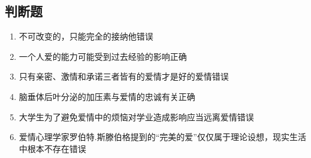 \documentclass{article}
\begin{document}
	\subsection*{判断题}
	\begin{enumerate}
		\item 不可改变的，只能完全的接纳他\hfill 错误
		
		\item 一个人爱的能力可能受到过去经验的影响\hfill 正确
		
		\item 只有亲密、激情和承诺三者皆有的爱情才是好的爱情\hfill 错误 

		\item 脑垂体后叶分泌的加压素与爱情的忠诚有关\hfill 正确

		\item 大学生为了避免爱情中的烦恼对学业造成影响应当远离爱情\hfill 错误

		\item 爱情心理学家罗伯特.斯滕伯格提到的“完美的爱”仅仅属于理论设想，现实生活中根本不存在\hfill 错误

	\end{enumerate}
\end{document}
